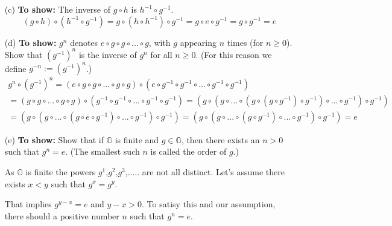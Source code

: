 \begin{itemize}
	\item [(c)]
	\textbf{To show:} The inverse of \(g \circ h\) is \(h^{-1} \circ g^{-1}\).
	\begin{equation*}
		(g \circ h) \circ (h^{-1} \circ g^{-1}) = g \circ (h \circ h^{-1}) \circ g^{-1} = g \circ e \circ g^{-1} = g  \circ g^{-1} = e			
	\end{equation*}
	\item [(d)]
	\textbf{To show:} \(g^n\) denotes \(e \circ g \circ g \circ ... \circ g\), with \(g\) appearing \(n\) times (for \(n \ge 0\)). Show that \((g^{-1})^n\) is the inverse of \(g^n\) for all \(n \ge 0\). (For this reason we define \(g^{-n} := (g^{-1})^n\).)
	\begin{equation*}
		\begin{array}{l}
		g^n \circ (g^{-1})^n = (e \circ g \circ g \circ ... \circ g \circ g) \circ (e \circ g^{-1} \circ g^{-1} \circ ... \circ g^{-1} \circ g^{-1}) \\
		= (g \circ g \circ ... \circ g \circ g) \circ (g^{-1} \circ g^{-1} \circ ... \circ g^{-1} \circ g^{-1})
		= (g \circ (g \circ ... \circ  (g\circ (g \circ g^{-1}) \circ g^{-1}) \circ ... \circ g^{-1})\circ g^{-1})\\
		= (g \circ (g \circ ... \circ  (g\circ e \circ g^{-1}) \circ ... \circ g^{-1})\circ g^{-1})
		= (g \circ (g \circ ... \circ  (g \circ g^{-1}) \circ ... \circ g^{-1})\circ g^{-1})
		= e
		\end{array}		
	\end{equation*}

	\item [(e)]
	\textbf{To show:} Show that if \(\mathds{G}\) is finite and \(g \in \mathds{G}\), then there exists an \(n > 0\) such that \(g^n = e\). (The smallest such \(n\) is called the order of \(g\).)

	As $\mathbb{G}$ is finite the powers $g^1$,$g^2$,$g^3$,..... are not all distinct.
	Let's assume there exists $x<y$ such that $g^x = g^y$.

	That implies $g^{y-x} = e$ and $y-x >0 $. To satisy this and our assumption, there should a positive number $n$ such that
	$g^n= e$.
\end{itemize} 